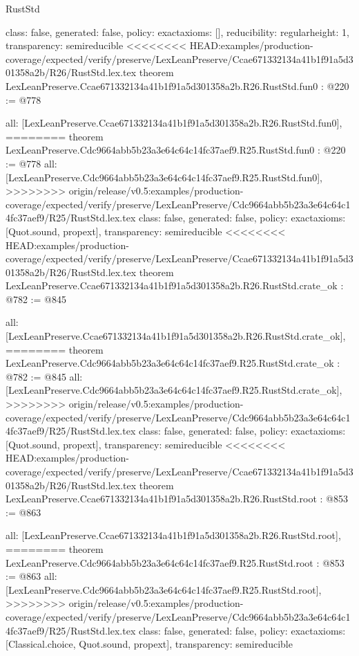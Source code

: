 \begin{lexlean}{RustStd}
\begin{coremodule}
{\begin{coremodule}
{{{  class: false,
  generated: false,
  policy: exact{axioms: []},
  reducibility: regular{height: 1},
  transparency: semireducible
}
<<<<<<<< HEAD:examples/production-coverage/expected/verify/preserve/LexLeanPreserve/Ccae671332134a41b1f91a5d301358a2b/R26/RustStd.lex.tex
theorem LexLeanPreserve.Ccae671332134a41b1f91a5d301358a2b.R26.RustStd.fun0 : @220 := @778 {
  all: [LexLeanPreserve.Ccae671332134a41b1f91a5d301358a2b.R26.RustStd.fun0],
========
theorem LexLeanPreserve.Cdc9664abb5b23a3e64c64c14fc37aef9.R25.RustStd.fun0 : @220 := @778 {
  all: [LexLeanPreserve.Cdc9664abb5b23a3e64c64c14fc37aef9.R25.RustStd.fun0],
>>>>>>>> origin/release/v0.5:examples/production-coverage/expected/verify/preserve/LexLeanPreserve/Cdc9664abb5b23a3e64c64c14fc37aef9/R25/RustStd.lex.tex
  class: false,
  generated: false,
  policy: exact{axioms: [Quot.sound, propext]},
  transparency: semireducible
}
<<<<<<<< HEAD:examples/production-coverage/expected/verify/preserve/LexLeanPreserve/Ccae671332134a41b1f91a5d301358a2b/R26/RustStd.lex.tex
theorem LexLeanPreserve.Ccae671332134a41b1f91a5d301358a2b.R26.RustStd.crate_ok : @782 := @845 {
  all: [LexLeanPreserve.Ccae671332134a41b1f91a5d301358a2b.R26.RustStd.crate_ok],
========
theorem LexLeanPreserve.Cdc9664abb5b23a3e64c64c14fc37aef9.R25.RustStd.crate_ok : @782 := @845 {
  all: [LexLeanPreserve.Cdc9664abb5b23a3e64c64c14fc37aef9.R25.RustStd.crate_ok],
>>>>>>>> origin/release/v0.5:examples/production-coverage/expected/verify/preserve/LexLeanPreserve/Cdc9664abb5b23a3e64c64c14fc37aef9/R25/RustStd.lex.tex
  class: false,
  generated: false,
  policy: exact{axioms: [Quot.sound, propext]},
  transparency: semireducible
}
<<<<<<<< HEAD:examples/production-coverage/expected/verify/preserve/LexLeanPreserve/Ccae671332134a41b1f91a5d301358a2b/R26/RustStd.lex.tex
theorem LexLeanPreserve.Ccae671332134a41b1f91a5d301358a2b.R26.RustStd.root : @853 := @863 {
  all: [LexLeanPreserve.Ccae671332134a41b1f91a5d301358a2b.R26.RustStd.root],
========
theorem LexLeanPreserve.Cdc9664abb5b23a3e64c64c14fc37aef9.R25.RustStd.root : @853 := @863 {
  all: [LexLeanPreserve.Cdc9664abb5b23a3e64c64c14fc37aef9.R25.RustStd.root],
>>>>>>>> origin/release/v0.5:examples/production-coverage/expected/verify/preserve/LexLeanPreserve/Cdc9664abb5b23a3e64c64c14fc37aef9/R25/RustStd.lex.tex
  class: false,
  generated: false,
  policy: exact{axioms: [Classical.choice, Quot.sound, propext]},
  transparency: semireducible
}

}}}}}
\end{coremodule}}
\end{coremodule}
\end{lexlean}
